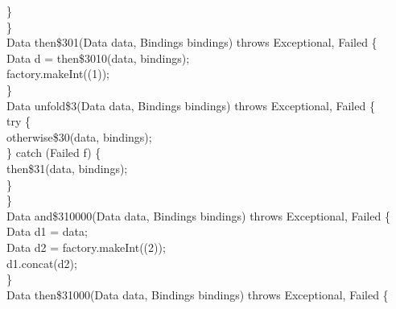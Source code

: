 \begin{flushleft}
\hspace*{8\indentation}\}\mbox{}\\
\hspace*{4\indentation}\}\mbox{}\\
\hspace*{4\indentation}{\bf private} Data then\$301(Data data, Bindings bindings)	throws Exceptional, Failed \{\mbox{}\\
\hspace*{8\indentation}Data d = then\$3010(data, bindings);\mbox{}\\
\hspace*{8\indentation}{\bf return} factory.makeInt((1));\mbox{}\\
\hspace*{4\indentation}\}\mbox{}\\
\hspace*{4\indentation}{\bf private} Data unfold\$3(Data data, Bindings bindings) throws Exceptional, Failed \{\mbox{}\\
\hspace*{8\indentation}try \{\mbox{}\\
\hspace*{12\indentation}{\bf return} otherwise\$30(data, bindings);\mbox{}\\
\hspace*{8\indentation}\} catch (Failed f) \{\mbox{}\\
\hspace*{12\indentation}{\bf return} then\$31(data, bindings);\mbox{}\\
\hspace*{8\indentation}\}\mbox{}\\
\hspace*{4\indentation}\}\mbox{}\\
\hspace*{4\indentation}{\bf private} Data and\$310000(Data data, Bindings bindings) throws Exceptional, Failed \{\mbox{}\\
\hspace*{8\indentation}Data d1 = data;\mbox{}\\
\hspace*{8\indentation}Data d2 = factory.makeInt((2));\mbox{}\\
\hspace*{8\indentation}{\bf return} d1.concat(d2);\mbox{}\\
\hspace*{4\indentation}\}\mbox{}\\
\hspace*{4\indentation}{\bf private} Data then\$31000(Data data, Bindings bindings) throws Exceptional, Failed \{\mbox{}\\

\end{flushleft}
